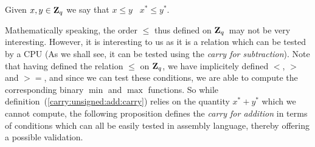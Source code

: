 \documentclass{article}
\newcommand{\zq}{\mbox{${\bf Z}_{q}$}}
\begin{document}
\begin{defin}\label{carry:order:zq}
  Given $x,y\in\zq$ we say that $x\leq y$ \ifand\ $x^{*}\leq y^{*}$.
\end{defin}

Mathematically speaking, the order $\leq$ thus defined on \zq\ may 
not be very interesting. However, it is interesting to us as it is 
a relation which can be tested by a CPU (As we shall see, it can
be tested using the {\em carry for subtraction}).
Note that having defined the relation $\leq$ on \zq, we have implicitely 
defined $<$, $>$ and $>=$, and since we can test these conditions, 
we are able to compute the corresponding binary $\min$ and $\max$ 
functions. So while definition~(\ref{carry:unsigned:add:carry}) 
relies on the quantity $x^{*}+y^{*}$ which we cannot compute,
the following proposition defines the {\em carry for addition} in
terms of conditions which can all be easily tested in assembly
language, thereby offering a possible validation.
\end{document}
